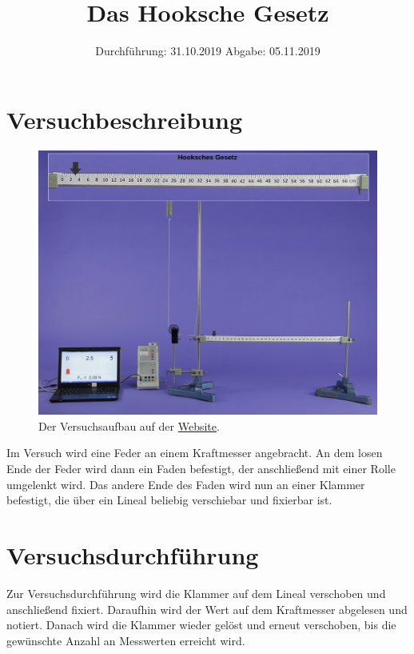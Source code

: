 

\subject{802}
\title{Das Hooksche Gesetz}
\date{%
  Durchführung: 31.10.2019
  \hspace{3em}
  Abgabe: 05.11.2019
}


\maketitle
\thispagestyle{empty}
\tableofcontents
\newpage

 \section{Versuchbeschreibung}
\begin{figure}
  \centering
  \includegraphics[width=\textwidth]{content/Hooksche_Gesetzt.png}
  \caption{Der Versuchsaufbau auf der \href{http://hyperion.didaktik.physik.uni-due.de/IBEs/Hooke.php}{Website}.}
  \label{fig:Versuchsaufbau}
\end{figure}
Im Versuch wird eine Feder an einem Kraftmesser angebracht. An dem losen Ende der Feder
wird dann ein Faden befestigt, der anschließend mit einer Rolle umgelenkt wird. 
Das andere Ende des Faden wird nun an einer Klammer befestigt,
die über ein Lineal beliebig verschiebar und fixierbar ist.
  \section{Versuchsdurchführung}
Zur Versuchsdurchführung wird die Klammer auf dem Lineal verschoben und anschließend fixiert.
Daraufhin wird der Wert auf dem Kraftmesser abgelesen und notiert.
Danach wird die Klammer wieder gelöst und erneut verschoben, bis die gewünschte Anzahl an Messwerten erreicht wird.
